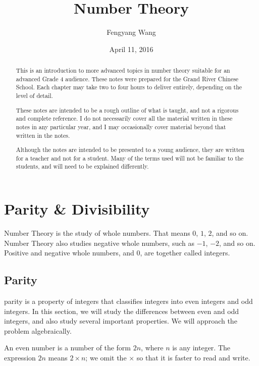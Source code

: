 \documentclass[a4paper,10pt]{report}
\title{Number Theory}
\author{Fengyang Wang}
\date{April 11, 2016}
\begin{document}
\begin{abstract}

 This is an introduction to more advanced topics in number theory suitable for
 an advanced Grade 4 audience. These notes were prepared for the Grand River
 Chinese School. Each chapter may take two to four hours to deliver entirely,
 depending on the level of detail.

 These notes are intended to be a rough outline of what is taught, and not a
 rigorous and complete reference. I do not necessarily cover all the material
 written in these notes in any particular year, and I may occasionally cover
 material beyond that written in the notes.

 Although the notes are intended to be presented to a young audience, they are
 written for a teacher and not for a student. Many of the terms used will not be
 familiar to the students, and will need to be explained differently.

\end{abstract}

\maketitle

\tableofcontents

\chapter{Parity \& Divisibility}

Number Theory is the study of whole numbers. That means $0$, $1$, $2$, and so
on. Number Theory also studies negative whole numbers, such as $-1$, $-2$, and
so on. Positive and negative whole numbers, and $0$, are together called
\glspl{integer}.

\section{Parity}

\Gls{parity} is a property of integers that classifies integers into even
integers and odd integers. In this section, we will study the differences
between even and odd integers, and also study several important properties. We
will approach the problem algebraically.

An even number is a number of the form $2n$, where $n$ is any integer. The
expression $2n$ means $2\times n$; we omit the $\times$ so that it is faster to
read and write.
\end{document}
